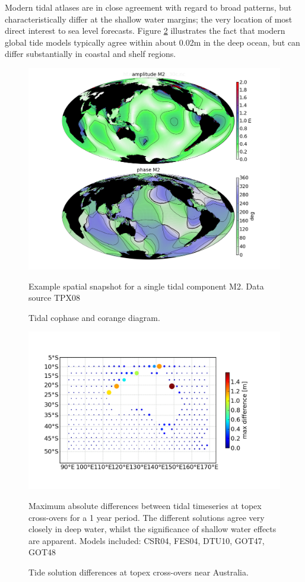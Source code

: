 Modern tidal atlases are in close agreement with regard to broad patterns, but characteristically differ at the shallow water margins; the very location of most direct interest to sea level forecasts.  Figure \ref{fig:tpx_cross} illustrates the fact that modern global tide models typically agree within about 0.02m in the deep ocean, but can differ substantially in coastal and shelf regions.  
\begin{figure}[!hbt] \centering
    \includegraphics[width=\figwidthBig]{figures/maps/global_m2_tpx08.png}
    \caption{Tidal cophase and corange diagram.}{Example spatial snapshot for a single tidal component M2.  Data source TPX08 \citep{Egbert:2002ug}  }
    \label{fig:atlas}
\end{figure}
\begin{figure}[!hbt] \centering
    \includegraphics[width=\figwidthBig]{figures/maps/map_tide_differences_tpx_xovers.png}
    \caption{Tide solution differences at topex cross-overs near Australia.}{Maximum absolute differences between tidal timeseries at topex cross-overs for a 1 year period. The different solutions agree very closely in deep water, whilst the significance of shallow water effects are apparent.  Models included: CSR04\citep{Eanes:1996tr}, FES04\citep{Lyard:2006ir}, DTU10\citep{IMPROVEMENTOFGLOBA:2010tu}, GOT47, GOT48\citep{Schrama:1994vr,Ray:1999vm} }
    \label{fig:tpx_cross}
\end{figure}
